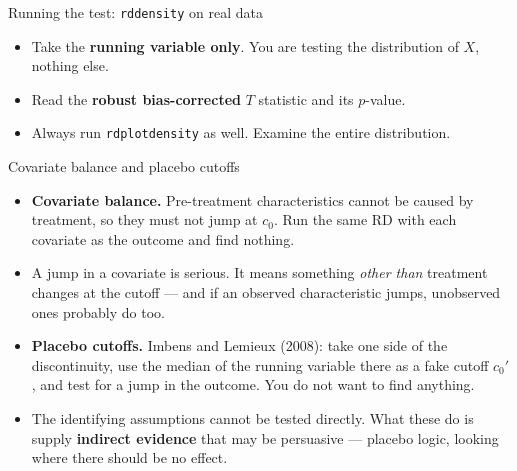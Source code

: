 \documentclass[
  11pt,
  ignorenonframetext,
  aspectratio=169,
]{beamer}
\newenvironment{Shaded}{\begin{snugshade}}{\end{snugshade}}
\newcommand{\AttributeTok}[1]{\textcolor[rgb]{0.40,0.45,0.13}{#1}}
\newcommand{\CommentTok}[1]{\textcolor[rgb]{0.37,0.37,0.37}{#1}}
\newcommand{\DecValTok}[1]{\textcolor[rgb]{0.68,0.00,0.00}{#1}}
\newcommand{\FloatTok}[1]{\textcolor[rgb]{0.68,0.00,0.00}{#1}}
\newcommand{\FunctionTok}[1]{\textcolor[rgb]{0.28,0.35,0.67}{#1}}
\newcommand{\NormalTok}[1]{\textcolor[rgb]{0.00,0.23,0.31}{#1}}
\newcommand{\OtherTok}[1]{\textcolor[rgb]{0.00,0.23,0.31}{#1}}
\newcommand{\SpecialCharTok}[1]{\textcolor[rgb]{0.37,0.37,0.37}{#1}}
\newcommand{\StringTok}[1]{\textcolor[rgb]{0.13,0.47,0.30}{#1}}
\providecommand{\tightlist}{%
  \setlength{\itemsep}{0pt}\setlength{\parskip}{0pt}}
\begin{document}
\begin{frame}[fragile]{Running the test: \texttt{rddensity} on real
data}
\protect{}\label{running-the-test-rddensity-on-real-data}
\begin{Shaded}
\end{Shaded}

\vspace{-0.3em}

\begin{itemize}
\tightlist
\item
  Take the \textbf{running variable only}. You are testing the
  distribution of \(X\), nothing else.
\item
  Read the \textbf{robust bias-corrected} \(T\) statistic and its
  \(p\)-value.
\item
  Always run \texttt{rdplotdensity} as well. Examine the entire
  distribution.
\end{itemize}
\end{frame}

\begin{frame}{Covariate balance and placebo cutoffs}
\protect{}\label{covariate-balance-and-placebo-cutoffs}
\begin{itemize}
\tightlist
\item
  \textbf{Covariate balance.} Pre-treatment characteristics cannot be
  caused by treatment, so they must not jump at \(c_0\). Run the same RD
  with each covariate as the outcome and find nothing.
\item
  A jump in a covariate is serious. It means something \emph{other than}
  treatment changes at the cutoff --- and if an observed characteristic
  jumps, unobserved ones probably do too.
\item
  \textbf{Placebo cutoffs.} Imbens and Lemieux (2008): take one side of
  the discontinuity, use the median of the running variable there as a
  fake cutoff \(c_0'\), and test for a jump in the outcome. You do not
  want to find anything.
\item
  The identifying assumptions cannot be tested directly. What these do
  is supply \textbf{indirect evidence} that may be persuasive ---
  placebo logic, looking where there should be no effect.
\end{itemize}
\end{frame}
\end{document}

